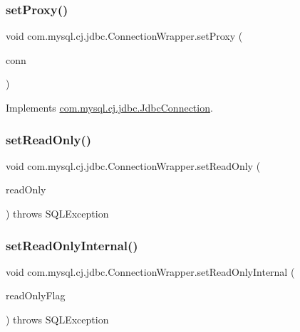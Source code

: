 \subsubsection{\texorpdfstring{set\+Proxy()}{setProxy()}}
{\footnotesize\ttfamily void com.\+mysql.\+cj.\+jdbc.\+Connection\+Wrapper.\+set\+Proxy (\begin{DoxyParamCaption}\item[{\mbox{\hyperlink{interfacecom_1_1mysql_1_1cj_1_1jdbc_1_1_jdbc_connection}{Jdbc\+Connection}}}]{conn }\end{DoxyParamCaption})}



Implements \mbox{\hyperlink{interfacecom_1_1mysql_1_1cj_1_1jdbc_1_1_jdbc_connection_a48162c9f0bf249804ae60cb7404cd0f8}{com.\+mysql.\+cj.\+jdbc.\+Jdbc\+Connection}}.

\mbox{\label{classcom_1_1mysql_1_1cj_1_1jdbc_1_1_connection_wrapper_ae9150565f43b006b5f70ca1d966b2456}} 
\subsubsection{\texorpdfstring{set\+Read\+Only()}{setReadOnly()}}
{\footnotesize\ttfamily void com.\+mysql.\+cj.\+jdbc.\+Connection\+Wrapper.\+set\+Read\+Only (\begin{DoxyParamCaption}\item[{boolean}]{read\+Only }\end{DoxyParamCaption}) throws S\+Q\+L\+Exception}

\mbox{\label{classcom_1_1mysql_1_1cj_1_1jdbc_1_1_connection_wrapper_a0338dffff24ec375538f88cfee0ecdb4}} 
\subsubsection{\texorpdfstring{set\+Read\+Only\+Internal()}{setReadOnlyInternal()}}
{\footnotesize\ttfamily void com.\+mysql.\+cj.\+jdbc.\+Connection\+Wrapper.\+set\+Read\+Only\+Internal (\begin{DoxyParamCaption}\item[{boolean}]{read\+Only\+Flag }\end{DoxyParamCaption}) throws S\+Q\+L\+Exception}



